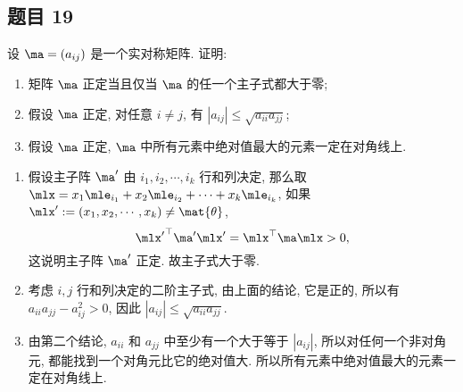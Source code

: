 \subsection*{ 题目 19 }
\begin{problem*}
设 $\ma = (a_{ij})$ 是一个实对称矩阵. 证明: 
\begin{enumerate}
    \item 矩阵 $\ma$ 正定当且仅当 $\ma$ 的任一个主子式都大于零;
    \item 假设 $\ma$ 正定, 对任意 $i \not= j$, 有 $|a_{ij}| \leqslant \sqrt{a_{ii}a_{jj}}$;
    \item 假设 $\ma$ 正定, $\ma$ 中所有元素中绝对值最大的元素一定在对角线上.
\end{enumerate}
\end{problem*}
\begin{solution}
\begin{enumerate}
    \item 假设主子阵 $\ma^\prime$ 由 $i_1, i_2, \cdots, i_k$ 行和列决定, 那么取 $\mlx = x_1 \mle_{i_1} + x_2 \mle_{i_2} + \cdots + x_k \mle_{i_k}$, 如果 $\mlx^\prime := (x_1, x_2, \cdots, x_k) \not= \mat{\theta}$,
    \[
        \quadform{\mlx^\prime}{\ma^\prime} = \quadform{\mlx}{\ma} > 0,
    \]
    这说明主子阵 $\ma^\prime$ 正定. 故主子式大于零.
    \item 考虑 $i, j$ 行和列决定的二阶主子式, 由上面的结论, 它是正的, 所以有 $a_{ii} a_{jj} - a_{ij}^2 > 0$, 因此 $|a_{ij}| \leqslant \sqrt{a_{ii}a_{jj}}$.
    \item 由第二个结论, $a_{ii}$ 和 $a_{jj}$ 中至少有一个大于等于 $|a_{ij}|$, 所以对任何一个非对角元, 都能找到一个对角元比它的绝对值大. 所以所有元素中绝对值最大的元素一定在对角线上.
\end{enumerate}
\end{solution}

\newpage
